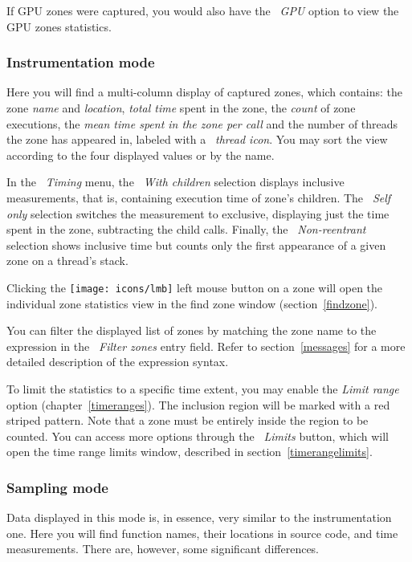 \documentclass[hidelinks,titlepage,a4paper,twoside]{article}
\newcommand{\LMB}{\texttt{[image: icons/lmb]}}
\begin{document}
If GPU zones were captured, you would also have the \emph{\faEye{}~GPU} option to view the GPU zones statistics.

\subsubsection{Instrumentation mode}

Here you will find a multi-column display of captured zones, which contains: the zone \emph{name} and \emph{location}, \emph{total time} spent in the zone, the \emph{count} of zone executions, the \emph{mean time spent in the zone per call} and the number of threads the zone has appeared in, labeled with a \emph{\faRandom~thread icon}. You may sort the view according to the four displayed values or by the name.

In the \emph{~Timing} menu, the \emph{~With children} selection displays inclusive measurements, that is, containing execution time of zone's children. The \emph{~Self only} selection switches the measurement to exclusive, displaying just the time spent in the zone, subtracting the child calls. Finally, the \emph{~Non-reentrant} selection shows inclusive time but counts only the first appearance of a given zone on a thread's stack.

Clicking the \LMB{} left mouse button on a zone will open the individual zone statistics view in the find zone window (section~\ref{findzone}).

You can filter the displayed list of zones by matching the zone name to the expression in the \emph{\faFilter{}~Filter zones} entry field. Refer to section~\ref{messages} for a more detailed description of the expression syntax.

To limit the statistics to a specific time extent, you may enable the \emph{Limit range} option (chapter~\ref{timeranges}). The inclusion region will be marked with a red striped pattern. Note that a zone must be entirely inside the region to be counted. You can access more options through the \emph{\faRuler{}~Limits} button, which will open the time range limits window, described in section~\ref{timerangelimits}.

\subsubsection{Sampling mode}
\label{statisticssampling}

Data displayed in this mode is, in essence, very similar to the instrumentation one. Here you will find function names, their locations in source code, and time measurements. There are, however, some significant differences.
\end{document}
